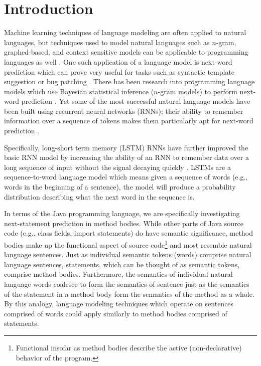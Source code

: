\documentclass[runningheads,a4paper]{llncs}
\begin{document}
\section{Introduction}
\label{submission}

Machine learning techniques of language modeling are often applied
to natural languages, but techniques used to model natural languages
such as $n$-gram, graphed-based, and context sensitive models
can be applicable to programming languages as well
\cite{Allamanis} \cite{Nguyen} \cite{Asaduzzaman}.
One such application of a language model is next-word prediction
which can prove very useful for tasks such as syntactic template
suggestion or bug patching
\cite{Nguyen} \cite{Kim}.
There has been research into programming language models
which use Bayesian statistical inference ($n$-gram models)
to perform next-word prediction \cite{Allamanis}.
Yet some of the most successful natural language models have been
built using recurrent neural networks (RNNs); their ability to
remember information over a sequence of tokens makes them particularly apt for
next-word prediction \cite{LSTMArticle}.

Specifically, long-short term memory (LSTM) RNNs have further improved
the basic RNN model by increasing the ability of an RNN to remember
data over a long sequence of input without the signal decaying
quickly \cite{LSTMArticle}. LSTMs are a sequence-to-word language
model which means given a sequence of words (e.g., words in the
beginning of a sentence), the model will produce a probability
distribution describing what the next word in the sequence is.

In terms of the Java programming language,
we are specifically investigating next-statement prediction in method
bodies. While other parts of Java source code (e.g., class fields,
import statements) do have semantic significance, method bodies make up
the functional aspect of source code\footnote{
Functional insofar as method bodies describe the active (non-declarative)
behavior of the program.} and most resemble natural language sentences.
Just as individual semantic tokens (words) comprise natural language
sentences, statements, which can be thought of as semantic tokens,
comprise method bodies. Furthermore, the semantics of individual natural
language words coalesce to form the semantics of sentence just as the
semantics of the statement in a method body form the semantics of the
method as a whole. By this analogy, language modeling techniques which
operate on sentences comprised of words could apply similarly to method
bodies comprised of statements.
\end{document}
